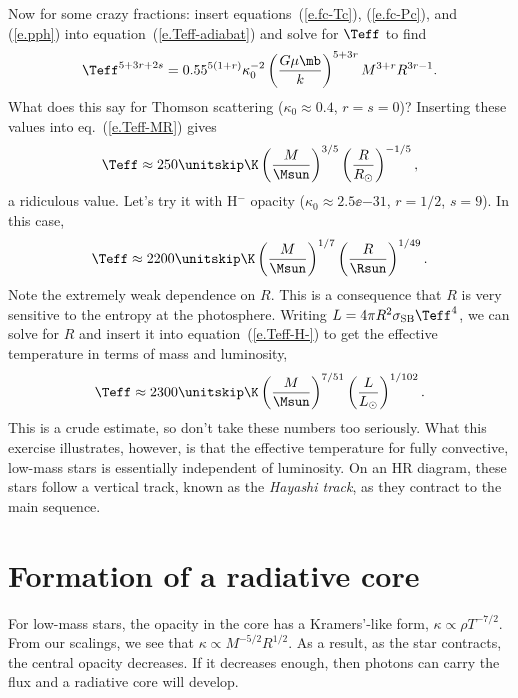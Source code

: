 Now for some crazy fractions: insert equations~(\ref{e.fc-Tc}), (\ref{e.fc-Pc}), and (\ref{e.pph}) into equation~(\ref{e.Teff-adiabat}) and solve for $\Teff$ to find
\begin{equation}\label{e.Teff-MR}
\Teff^{5+3r+2s} = 0.55^{5(1+r)}\kappa_{0}^{-2} \left(\frac{G\mu\mb}{k}\right)^{5+3r}M^{3+r} R^{3r-1}.
\end{equation}
What does this say for Thomson scattering ($\kappa_{0} \approx 0.4$, $r=s=0$)? Inserting these values into eq.~(\ref{e.Teff-MR}) gives
\begin{equation}\label{e.Teff-th}
	\Teff \approx 250\nsp\K \left(\frac{M}{\Msun}\right)^{3/5}\left(\frac{R}{R_{\odot}}\right)^{-1/5},
\end{equation}
a ridiculous value. Let's try it with H$^{-}$ opacity ($\kappa_{0} \approx 2.5\ee{-31}$, $r=1/2$, $s=9$). In this case,
\begin{equation}\label{e.Teff-H-}
 \Teff \approx 2200\nsp\K \left(\frac{M}{\Msun}\right)^{1/7}\left(\frac{R}{\Rsun}\right)^{1/49}.
\end{equation}
Note the extremely weak dependence on $R$.  This is a consequence that $R$ is very sensitive to the entropy at the photosphere.  Writing $L = 4\pi R^{2}\ssb \Teff^{4}$, we can solve for $R$ and insert it into equation~(\ref{e.Teff-H-}) to get the effective temperature in terms of mass and luminosity,
\begin{equation}\label{e.Hayashi}
 \Teff \approx 2300\nsp\K \left(\frac{M}{\Msun}\right)^{7/51}\left(\frac{L}{L_{\odot}}\right)^{1/102}.
\end{equation}
This is a crude estimate, so don't take these numbers too seriously. What this exercise illustrates, however, is that the effective temperature for fully convective, low-mass stars is essentially independent of luminosity.  On an HR diagram, these stars follow a vertical track, known as the \emph{Hayashi track}, as they contract to the main sequence.

\section{Formation of a radiative core}

For low-mass stars, the opacity in the core has a Kramers'-like form, $\kappa \propto \rho T^{-7/2}$. From our scalings, we see that $\kappa \propto M^{-5/2} R^{1/2}$.  As a result, as the star contracts, the central opacity decreases.  If it decreases enough, then photons can carry the flux and a radiative core will develop.

